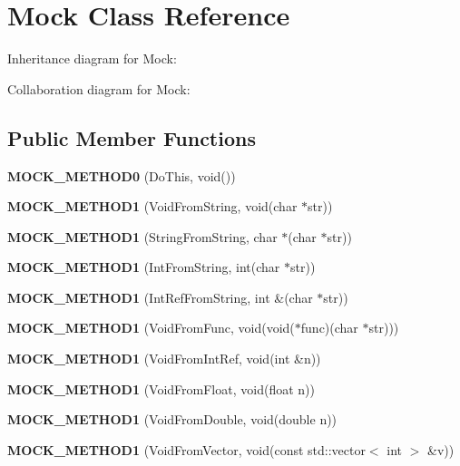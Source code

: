 \hypertarget{classMock}{}\section{Mock Class Reference}
\label{classMock}


Inheritance diagram for Mock\+:


Collaboration diagram for Mock\+:
\subsection*{Public Member Functions}
\begin{DoxyCompactItemize}
\item 
\mbox{\label{classMock_ae710f23cafb1a2f17772e8805d6312d2}} 
{\bfseries M\+O\+C\+K\+\_\+\+M\+E\+T\+H\+O\+D0} (Do\+This, void())
\item 
\mbox{\label{classMock_ada59eea6991953353f332e3ea1e74444}} 
{\bfseries M\+O\+C\+K\+\_\+\+M\+E\+T\+H\+O\+D1} (Void\+From\+String, void(char $\ast$str))
\item 
\mbox{\label{classMock_a2db4d82b6f92b4e462929f651ac4c3b1}} 
{\bfseries M\+O\+C\+K\+\_\+\+M\+E\+T\+H\+O\+D1} (String\+From\+String, char $\ast$(char $\ast$str))
\item 
\mbox{\label{classMock_ae73b4ee90bf6d84205d2b1c17f0b8433}} 
{\bfseries M\+O\+C\+K\+\_\+\+M\+E\+T\+H\+O\+D1} (Int\+From\+String, int(char $\ast$str))
\item 
\mbox{\label{classMock_a2cece30a3ea92b34f612f8032fe3a0f9}} 
{\bfseries M\+O\+C\+K\+\_\+\+M\+E\+T\+H\+O\+D1} (Int\+Ref\+From\+String, int \&(char $\ast$str))
\item 
\mbox{\label{classMock_ac70c052254fa9816bd759c006062dc47}} 
{\bfseries M\+O\+C\+K\+\_\+\+M\+E\+T\+H\+O\+D1} (Void\+From\+Func, void(void($\ast$func)(char $\ast$str)))
\item 
\mbox{\label{classMock_ae2379efbc030f1adf8b032be3bdf081d}} 
{\bfseries M\+O\+C\+K\+\_\+\+M\+E\+T\+H\+O\+D1} (Void\+From\+Int\+Ref, void(int \&n))
\item 
\mbox{\label{classMock_a3fd62026610c5d3d3aeaaf2ade3e18aa}} 
{\bfseries M\+O\+C\+K\+\_\+\+M\+E\+T\+H\+O\+D1} (Void\+From\+Float, void(float n))
\item 
\mbox{\label{classMock_a890668928abcd28d4d39df164e7b6dd8}} 
{\bfseries M\+O\+C\+K\+\_\+\+M\+E\+T\+H\+O\+D1} (Void\+From\+Double, void(double n))
\item 
\mbox{\label{classMock_a50e2bda4375a59bb89fd5652bd33eb0f}} 
{\bfseries M\+O\+C\+K\+\_\+\+M\+E\+T\+H\+O\+D1} (Void\+From\+Vector, void(const std\+::vector$<$ int $>$ \&v))
\end{DoxyCompactItemize}


